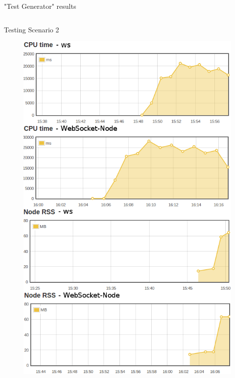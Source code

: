 \documentclass{soa.cs.pub.ro}
\begin{document}
\begin{frame}{"Test Generator" results}
\begin{columns}
\begin{column}[l]{0.45\textwidth}
\begin{center}
        Testing Scenario 2
      \end{center}
      \begin{figure}
         \includegraphics[scale=0.18]{img/test2v2.png}
      \end{figure}
    \end{column}
  \end{columns}
\end{frame}
\end{document}
